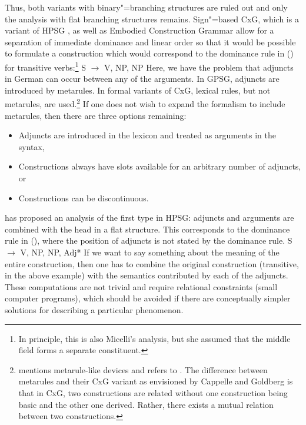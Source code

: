 Thus, both variants with binary"=branching structures are ruled out and only the analysis with flat branching structures remains.
Sign"=based CxG, which is a variant of HPSG \citep[]{Sag2010b}, as well as Embodied Construction Grammar \citep[]{BC2005a} allow for
a separation of immediate dominance and linear order so that it would be possible to
formulate a construction which would correspond to the dominance rule in () for transitive verbs:\footnote{%
	In principle, this is also Micelli's analysis, but she assumed that the middle field forms a separate constituent.%
}
\ea
S $\to$ V, NP, NP
\z
Here, we have the problem that adjuncts in German can occur between any of the arguments. In GPSG, adjuncts are introduced by metarules.
In formal variants of CxG, lexical rules, but not metarules, are used.\footnote{\label{fn-allostructions}%
  \citet[]{Goldberg2014a} mentions metarule-like devices and refers to
  . The difference between metarules and their CxG variant as envisioned by
  Cappelle and Goldberg is that in CxG, two constructions are related without one construction being
  basic and the other one derived. Rather, there exists a mutual relation between two constructions.%
} If one does not wish to expand the formalism to include metarules,
then there are three options remaining:
\begin{itemize}
\item Adjuncts are introduced in the lexicon \citep*{NB94,BMS2001a} and treated as arguments in the syntax,
\item Constructions always have slots available for an arbitrary number of adjuncts, or
\item Constructions can be discontinuous.
\end{itemize}

\noindent
\citet{Kasper94a} has proposed an analysis of the first type in HPSG: adjuncts and arguments are combined with the head in a flat structure.
This corresponds to the dominance rule in (), where the position of adjuncts is not stated by the dominance rule.
\ea
S $\to$ V, NP, NP, Adj*
\z
If we want to say something about the meaning of the entire construction, then one has to combine the original construction (transitive, in the above example)
with the semantics contributed by each of the adjuncts. These computations are not trivial and require relational constraints (small computer programs), which
should be avoided if there are conceptually simpler solutions for describing a particular phenomenon.

